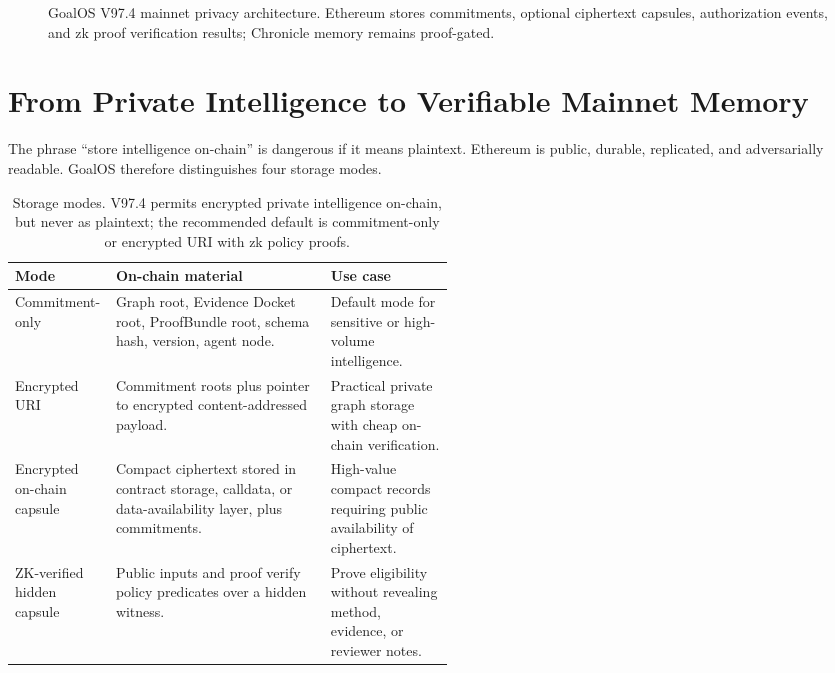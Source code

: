 \documentclass[11pt]{article}
\begin{document}
\begin{figure}[t]
{}
\caption{GoalOS V97.4 mainnet privacy architecture. Ethereum stores commitments, optional ciphertext capsules, authorization events, and zk proof verification results; Chronicle memory remains proof-gated.}
\label{fig:architecture}
\end{figure}

\section{From Private Intelligence to Verifiable Mainnet Memory}
The phrase ``store intelligence on-chain'' is dangerous if it means plaintext. Ethereum is public, durable, replicated, and adversarially readable. GoalOS therefore distinguishes four storage modes.

\begin{table}[h]
\centering
\small
\begin{tabularx}{\linewidth}{p{0.23\linewidth}Yp{0.28\linewidth}}
\toprule
\textbf{Mode} & \textbf{On-chain material} & \textbf{Use case} \\
\midrule
Commitment-only & Graph root, Evidence Docket root, ProofBundle root, schema hash, version, agent node. & Default mode for sensitive or high-volume intelligence. \\
Encrypted URI & Commitment roots plus pointer to encrypted content-addressed payload. & Practical private graph storage with cheap on-chain verification. \\
Encrypted on-chain capsule & Compact ciphertext stored in contract storage, calldata, or data-availability layer, plus commitments. & High-value compact records requiring public availability of ciphertext. \\
ZK-verified hidden capsule & Public inputs and proof verify policy predicates over a hidden witness. & Prove eligibility without revealing method, evidence, or reviewer notes. \\
\bottomrule
\end{tabularx}
\caption{Storage modes. V97.4 permits encrypted private intelligence on-chain, but never as plaintext; the recommended default is commitment-only or encrypted URI with zk policy proofs.}
\label{tab:storage}
\end{table}
\end{document}
